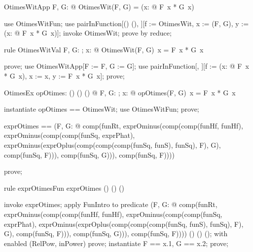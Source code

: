 \documentclass{article}
\begin{document}
\begin{theorem}{OtimesWitApp}
  \forall F, G: \nat \fun \nat @ OtimesWit(F, G) = (\lambda x: \nat @ F~x * G~x)
\end{theorem}

\begin{zproof}
use OtimesWitFun;
use pairInFunction[(\nat \fun \nat) \cross (\nat \fun \nat), \nat \fun \nat][f := OtimesWit, x := (F, G), y := (\lambda x: \nat @ F~x * G~x)];
invoke OtimesWit;
prove by reduce;
\end{zproof}

\begin{theorem}{rule OtimesWitVal}
  \forall F, G: \nat \fun \nat; x: \nat @ OtimesWit(F, G)~x = F~x * G~x
\end{theorem}

\begin{zproof}
prove;
use OtimesWitApp[F := F, G := G];
use pairInFunction[\nat, \nat][f := (\lambda x: \nat @ F~x * G~x), x := x, y := F~x * G~x];
prove;
\end{zproof}

\begin{theorem}{OtimesEx}
  \exists opOtimes: (\nat \fun \nat) \cross (\nat \fun \nat) \fun (\nat \fun \nat) @ \forall F, G: \nat \fun \nat; x: \nat @ opOtimes(F, G)~x = F~x * G~x
\end{theorem}

\begin{zproof}
instantiate opOtimes == OtimesWit;
use OtimesWitFun;
prove;
\end{zproof}

\begin{zed}
  exprOtimes == (\lambda F, G: \nat \fun \nat @ comp(funRt, exprOminus(comp(comp(funHf, funHf), exprOminus(comp(comp(funSq, exprPhat), exprOminus(exprOplus(comp(comp(comp(funSq, funS), funSq), F), G), comp(funSq, F))), comp(funSq, G))), comp(funSq, F))))
\end{zed}

\begin{zproof}
prove;
\end{zproof}

\begin{theorem}{rule exprOtimesFun}
  exprOtimes \in (\nat \fun \nat) \cross (\nat \fun \nat) \fun (\nat \fun \nat)
\end{theorem}

\begin{zproof}
invoke exprOtimes;
apply FunIntro to predicate (\lambda F, G: \nat \fun \nat @ comp(funRt, exprOminus(comp(comp(funHf, funHf), exprOminus(comp(comp(funSq, exprPhat), exprOminus(exprOplus(comp(comp(comp(funSq, funS), funSq), F), G), comp(funSq, F))), comp(funSq, G))), comp(funSq, F)))) \in (\nat \fun \nat) \cross (\nat \fun \nat) \fun (\nat \fun \nat);
with enabled (RelPow, inPower) prove;
instantiate F == x.1, G == x.2;
prove;
\end{zproof}
\end{document}
